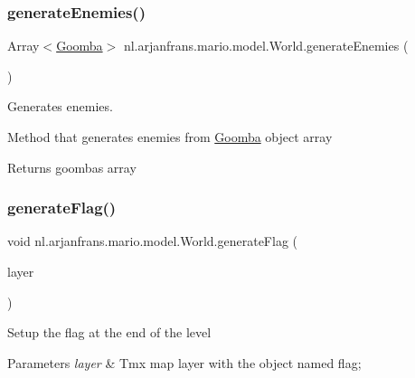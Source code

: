 \subsubsection{\texorpdfstring{generate\+Enemies()}{generateEnemies()}}
{\footnotesize\ttfamily Array$<$\hyperlink{classnl_1_1arjanfrans_1_1mario_1_1model_1_1Goomba}{Goomba}$>$ nl.\+arjanfrans.\+mario.\+model.\+World.\+generate\+Enemies (\begin{DoxyParamCaption}{ }\end{DoxyParamCaption})\hspace{0.3cm}{\ttfamily [private]}}



Generates enemies. 

Method that generates enemies from \hyperlink{classnl_1_1arjanfrans_1_1mario_1_1model_1_1Goomba}{Goomba} object array \begin{DoxyReturn}{Returns}
goombas array 
\end{DoxyReturn}
\mbox{\label{classnl_1_1arjanfrans_1_1mario_1_1model_1_1World_a5cd9c89d5e9a185c4b82b5bc2914967e}} 
\subsubsection{\texorpdfstring{generate\+Flag()}{generateFlag()}}
{\footnotesize\ttfamily void nl.\+arjanfrans.\+mario.\+model.\+World.\+generate\+Flag (\begin{DoxyParamCaption}\item[{Map\+Layer}]{layer }\end{DoxyParamCaption})\hspace{0.3cm}{\ttfamily [private]}}

Setup the flag at the end of the level 
\begin{DoxyParams}{Parameters}
{\em layer} & Tmx map layer with the object named \textquotesingle{}flag\textquotesingle{}; \\
\hline
\end{DoxyParams}
\mbox{\label{classnl_1_1arjanfrans_1_1mario_1_1model_1_1World_a8d4f869faea3c599334975f5511aca9a}} 
